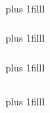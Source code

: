 \documentclass[fleqn]{beamer} %
\newcommand{\sectionIIIsubsectionIItitle}{}
\newcommand{\sectionIIIsubsectionIIItitle}{}
\newcommand{\sectionIIIsubsectionIVtitle}{}
\newcommand{\btVFill}{\vskip0pt plus 1filll}
\begin{document}
			\begin{frame}
				\frametitle{\sectionIIIsubsectionIItitle}

				\bigskip

				

				\btVFill

			\end{frame}

			\begin{frame}
				\frametitle{\sectionIIIsubsectionIItitle}

				\bigskip
			
			
				\btVFill

			\end{frame}

			\begin{frame}
				\frametitle{\sectionIIIsubsectionIItitle}

				\bigskip

				

				\btVFill
				
			\end{frame}

		\subsection{\sectionIIIsubsectionIIItitle}\label{sectionIIIsubsectionIII}	

			\begin{frame}[containsverbatim]
				\frametitle{\sectionIIIsubsectionIIItitle}\scriptsize
				
						
			
			\end{frame}


			\begin{frame}[containsverbatim]
				\frametitle{\sectionIIIsubsectionIIItitle}\scriptsize

				

				

			\end{frame}

			

		\subsection{\sectionIIIsubsectionIVtitle}\label{sectionIIIsubsectionIV}	
		
		\begin{frame} \scriptsize
		\frametitle{\sectionIIIsubsectionIVtitle}
		\bigskip




		\btVFill

		\end{frame}
	
\end{document}
